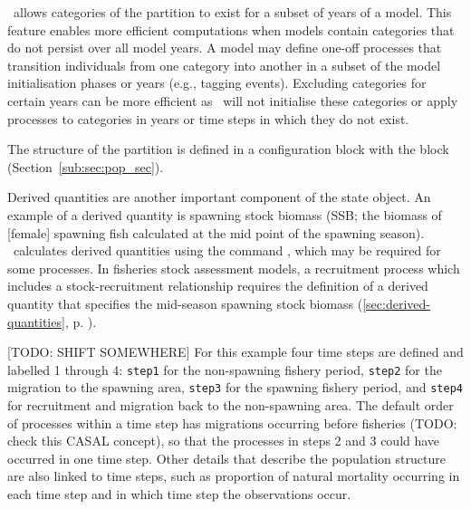 \CNAME~allows categories of the partition to exist for a subset of years of a model. This feature enables more efficient computations when models contain categories that do not persist over all model years. A model may define one-off processes that transition individuals from one category into another in a subset of the model initialisation phases or years (e.g., tagging events). Excluding categories for certain years can be more efficient as \CNAME~will not initialise these categories or apply processes to categories in years or time steps in which they do not exist.

The structure of the partition is defined in a configuration block with the  block (Section~\ref{sub:sec:pop_sec}).

Derived quantities are another important component of the state object. An example of a derived quantity is spawning stock biomass (SSB; the biomass of [female] spawning fish calculated at the mid point of the spawning season). \CNAME~calculates derived quantities using the command , which may be required for some processes. In fisheries stock assessment models, a recruitment process which includes a stock-recruitment relationship requires the definition of a derived quantity that specifies the mid-season spawning stock biomass (\ref{sec:derived-quantities}, p. \pageref{sec:derived-quantities}). 

[TODO: SHIFT SOMEWHERE] For this example four time steps are defined and labelled 1 through 4: \texttt{step1} for the non-spawning fishery period, \texttt{step2} for the migration to the spawning area, \texttt{step3} for the spawning fishery period, and \texttt{step4} for recruitment and migration back to the non-spawning area. The default order of processes within a time step has migrations occurring before fisheries (TODO: check this CASAL concept), so that the processes in steps 2 and 3 could have occurred in one time step. Other details that describe the population structure are also linked to time steps, such as proportion of natural mortality occurring in each time step and in which time step the observations occur.

\subsubsection{}

